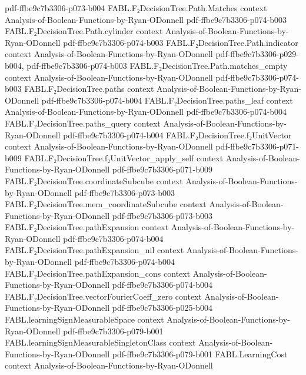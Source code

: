 \begin{theorem}
  {pdf-ffbe9c7b3306-p073-b004}
\proofstep
  {FABL.F₂DecisionTree.Path.Matches}
  {context}
  {Analysis-of-Boolean-Functions-by-Ryan-ODonnell}
  {pdf-ffbe9c7b3306-p074-b003}
\proofstep
  {FABL.F₂DecisionTree.Path.cylinder}
  {context}
  {Analysis-of-Boolean-Functions-by-Ryan-ODonnell}
  {pdf-ffbe9c7b3306-p074-b003}
\proofstep
  {FABL.F₂DecisionTree.Path.indicator}
  {context}
  {Analysis-of-Boolean-Functions-by-Ryan-ODonnell}
  {pdf-ffbe9c7b3306-p029-b004,
    pdf-ffbe9c7b3306-p074-b003}
\proofstep
  {FABL.F₂DecisionTree.Path.matches_empty}
  {context}
  {Analysis-of-Boolean-Functions-by-Ryan-ODonnell}
  {pdf-ffbe9c7b3306-p074-b003}
\proofstep
  {FABL.F₂DecisionTree.paths}
  {context}
  {Analysis-of-Boolean-Functions-by-Ryan-ODonnell}
  {pdf-ffbe9c7b3306-p074-b004}
\proofstep
  {FABL.F₂DecisionTree.paths_leaf}
  {context}
  {Analysis-of-Boolean-Functions-by-Ryan-ODonnell}
  {pdf-ffbe9c7b3306-p074-b004}
\proofstep
  {FABL.F₂DecisionTree.paths_query}
  {context}
  {Analysis-of-Boolean-Functions-by-Ryan-ODonnell}
  {pdf-ffbe9c7b3306-p074-b004}
\proofstep
  {FABL.F₂DecisionTree.f₂UnitVector}
  {context}
  {Analysis-of-Boolean-Functions-by-Ryan-ODonnell}
  {pdf-ffbe9c7b3306-p071-b009}
\proofstep
  {FABL.F₂DecisionTree.f₂UnitVector_apply_self}
  {context}
  {Analysis-of-Boolean-Functions-by-Ryan-ODonnell}
  {pdf-ffbe9c7b3306-p071-b009}
\proofstep
  {FABL.F₂DecisionTree.coordinateSubcube}
  {context}
  {Analysis-of-Boolean-Functions-by-Ryan-ODonnell}
  {pdf-ffbe9c7b3306-p073-b003}
\proofstep
  {FABL.F₂DecisionTree.mem_coordinateSubcube}
  {context}
  {Analysis-of-Boolean-Functions-by-Ryan-ODonnell}
  {pdf-ffbe9c7b3306-p073-b003}
\proofstep
  {FABL.F₂DecisionTree.pathExpansion}
  {context}
  {Analysis-of-Boolean-Functions-by-Ryan-ODonnell}
  {pdf-ffbe9c7b3306-p074-b004}
\proofstep
  {FABL.F₂DecisionTree.pathExpansion_nil}
  {context}
  {Analysis-of-Boolean-Functions-by-Ryan-ODonnell}
  {pdf-ffbe9c7b3306-p074-b004}
\proofstep
  {FABL.F₂DecisionTree.pathExpansion_cons}
  {context}
  {Analysis-of-Boolean-Functions-by-Ryan-ODonnell}
  {pdf-ffbe9c7b3306-p074-b004}
\proofstep
  {FABL.F₂DecisionTree.vectorFourierCoeff_zero}
  {context}
  {Analysis-of-Boolean-Functions-by-Ryan-ODonnell}
  {pdf-ffbe9c7b3306-p025-b004}
\proofstep
  {FABL.learningSignMeasurableSpace}
  {context}
  {Analysis-of-Boolean-Functions-by-Ryan-ODonnell}
  {pdf-ffbe9c7b3306-p079-b001}
\proofstep
  {FABL.learningSignMeasurableSingletonClass}
  {context}
  {Analysis-of-Boolean-Functions-by-Ryan-ODonnell}
  {pdf-ffbe9c7b3306-p079-b001}
\proofstep
  {FABL.LearningCost}
  {context}
  {Analysis-of-Boolean-Functions-by-Ryan-ODonnell}

\end{theorem}
